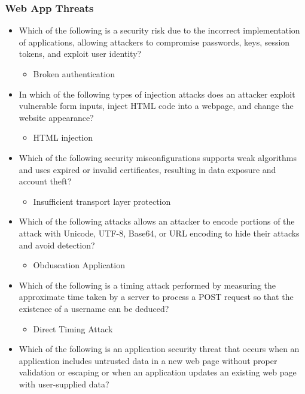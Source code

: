 \subsubsection{Web App Threats}
\begin{itemize}
    \item Which of the following is a security risk due to the incorrect implementation of applications, allowing attackers to compromise passwords, keys, session tokens, and exploit user identity?
    \begin{itemize}
        \item Broken authentication
    \end{itemize}
    \item In which of the following types of injection attacks does an attacker exploit vulnerable form inputs, inject HTML code into a webpage, and change the website appearance?
    \begin{itemize}
        \item HTML injection
    \end{itemize}
    \item Which of the following security misconfigurations supports weak algorithms and uses expired or invalid certificates, resulting in data exposure and account theft?
    \begin{itemize}
        \item Insufficient transport layer protection
    \end{itemize}
    \item Which of the following attacks allows an attacker to encode portions of the attack with Unicode, UTF-8, Base64, or URL encoding to hide their attacks and avoid detection?
    \begin{itemize}
        \item Obduscation Application
    \end{itemize}
    \item Which of the following is a timing attack performed by measuring the approximate time taken by a server to process a POST request so that the existence of a username can be deduced?
    \begin{itemize}
        \item Direct Timing Attack
    \end{itemize}
    \item Which of the following is an application security threat that occurs when an application includes untrusted data in a new web page without proper validation or escaping or when an application updates an existing web page with user-supplied data?

\end{itemize}
